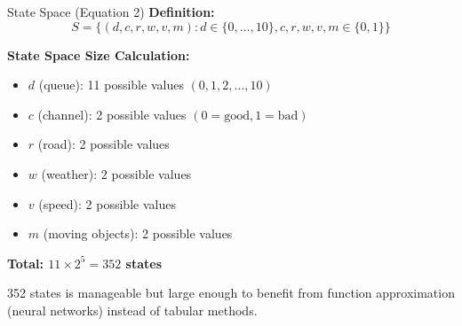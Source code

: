 \documentclass{beamer}
\begin{document}
\begin{frame}{State Space (Equation 2)}
  \textbf{Definition:}
  $$S = \{ (d, c, r, w, v, m) : d \in \{0,\ldots,10\}, c,r,w,v,m \in \{0,1\} \}$$

  \vspace{0.2cm}
  \textbf{State Space Size Calculation:}
  \begin{itemize}
    \item $d$ (queue): 11 possible values $(0, 1, 2, \ldots, 10)$
    \item $c$ (channel): 2 possible values $(0 = \text{good}, 1 = \text{bad})$
    \item $r$ (road): 2 possible values
    \item $w$ (weather): 2 possible values
    \item $v$ (speed): 2 possible values
    \item $m$ (moving objects): 2 possible values
  \end{itemize}

  \vspace{0.2cm}
  \textbf{Total: $11 \times 2^5 = 352$ states}

  \vspace{0.15cm}
  \small 352 states is manageable but large enough to benefit from function approximation (neural networks) instead of tabular methods.
\end{frame}
\end{document}
